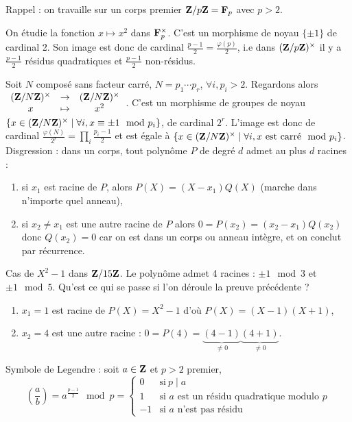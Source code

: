 Rappel : on travaille sur un corps premier $\mathbf{Z} / p\mathbf{Z} = \mathbf{F}_p$ avec $p > 2$.

On étudie la fonction $x \mapsto x^2$ dans $\mathbf{F}_p^\times$.
C'est un morphisme de noyau $\{ \pm 1 \}$ de cardinal 2.
Son image est donc de cardinal $\frac{p - 1}{2} = \frac{\varphi(p)}{2}$, i.e dans $(\mathbf{Z} / p\mathbf{Z})^\times$ il y a $\frac{p - 1}{2}$ résidus quadratiques et $\frac{p - 1}{2}$ non-résidus.

Soit $N$ composé sans facteur carré, $N = p_1 \cdots p_r$, $\forall i, p_i > 2$.
Regardons alors $\begin{array}{ccc} (\mathbf{Z} / N\mathbf{Z})^\times & \to & (\mathbf{Z} / N\mathbf{Z})^\times \\ x & \mapsto & x^2 \end{array}$.
C'est un morphisme de groupes de noyau $\left\{ x \in (\mathbf{Z} / N\mathbf{Z})^\times \mid \forall i, x \equiv \pm 1 \mod{p_i} \right\}$, de cardinal $2^r$.
L'image est donc de cardinal $\frac{\varphi(N)}{2^r} = \prod_i \frac{p_i - 1}{2}$ et est égale à $\left\{ x \in (\mathbf{Z} / N\mathbf{Z})^\times \mid \forall i, x\ \text{est carré} \mod{p_i} \right\}$.\\


Disgression : dans un corps, tout polynôme $P$ de degré $d$ admet au plus $d$ racines :
\begin{enumerate}[(1)]
	\item si $x_1$ est racine de $P$, alors $P(X) = (X - x_1) Q(X)$ (marche dans n'importe quel anneau),
	\item si $x_2 \neq x_1$ est une autre racine de $P$ alors $0 = P(x_2) = (x_2 - x_1) Q(x_2)$ donc $Q(x_2) = 0$ car on est dans un corps ou anneau intègre, et on conclut par récurrence.
\end{enumerate}

\begin{ex}
	Cas de $X^2 - 1$ dans $\mathbf{Z} / 15\mathbf{Z}$.
	Le polynôme admet 4 racines : $\pm 1 \mod 3$ et $\pm 1 \mod 5$.
	Qu'est ce qui se passe si l'on déroule la preuve précédente ?
	\begin{enumerate}[(1)]
		\item $x_1 = 1$ est racine de $P(X) = X^2 - 1$ d'où $P(X) = (X - 1)(X + 1)$,
		\item $x_2 = 4$ est une autre racine : $0 = P(4) = \underset{\neq 0}{\underbrace{(4 - 1)}} \underset{\neq 0}{\underbrace{(4 + 1)}}$.
	\end{enumerate}
\end{ex}

Symbole de Legendre : soit $a \in \mathbf{Z}$ et $p > 2$ premier,
$$\left( \frac{a}{b} \right)
	= a^{\frac{p - 1}{2}} \mod p
	= \left\{ \begin{array}{ll}
		0 & \text{si}\ p \mid a \\
		1 & \text{si $a$ est un résidu quadratique modulo $p$} \\
		-1 & \text{si $a$ n'est pas résidu}
		\end{array}\right.$$

